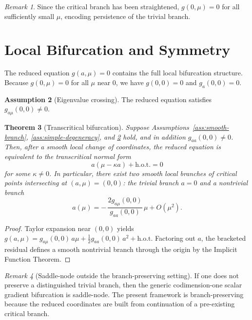 \documentclass[11pt, reqno]{amsart}
\theoremstyle{plain}
\newtheorem{theorem}{Theorem}[section]
\theoremstyle{definition}
\newtheorem{assumption}[theorem]{Assumption}
\theoremstyle{remark}
\newtheorem{remark}[theorem]{Remark}
\begin{document}
\begin{remark}\label{rem:straightened-branch}
Since the critical branch has been straightened, $g(0,\mu)=0$
for all sufficiently small $\mu$, encoding persistence of the trivial branch.
\end{remark}

\section{Local Bifurcation and Symmetry}\label{sec:bifurcation}

The reduced equation
$g(a,\mu)=0$
contains the full local bifurcation structure. Because $g(0,\mu)=0$ for all $\mu$ near $0$, we have
$g(0,0)=0$ and $g_a(0,0)=0$.

\begin{assumption}[Eigenvalue crossing]\label{ass:eigenvalue-crossing}
The reduced equation satisfies
$g_{a\mu}(0,0)\neq 0$.
\end{assumption}

\begin{theorem}[Transcritical bifurcation]\label{thm:transcritical}
Suppose Assumptions~\ref{ass:smooth-branch}, \ref{ass:simple-degeneracy}, and \ref{ass:eigenvalue-crossing} hold, and in addition
$g_{aa}(0,0)\neq 0$.
Then, after a smooth local change of coordinates, the reduced equation is equivalent to the transcritical normal form
\begin{equation}
  a(\mu-\kappa a)+\text{h.o.t.}=0
\end{equation}
for some $\kappa\neq 0$. In particular, there exist two smooth local branches of critical points intersecting at $(a,\mu)=(0,0)$: the trivial branch $a=0$ and a nontrivial branch
\begin{equation}
  a(\mu)= -\,\frac{2g_{a\mu}(0,0)}{g_{aa}(0,0)}\,\mu + O(\mu^2).
\end{equation}
\end{theorem}

\begin{proof}
Taylor expansion near $(0,0)$ yields
$g(a,\mu)=g_{a\mu}(0,0)\,a\mu+\tfrac12 g_{aa}(0,0)\,a^2+\text{h.o.t.}$
Factoring out $a$, the bracketed residual defines a smooth nontrivial branch through the origin by the Implicit Function Theorem.
\end{proof}

\begin{remark}[Saddle-node outside the branch-preserving setting]\label{rem:saddle-node}
If one does not preserve a distinguished trivial branch, then the generic codimension-one scalar gradient bifurcation is saddle-node. The present framework is branch-preserving because the reduced coordinates are built from continuation of a pre-existing critical branch.
\end{remark}
\end{document}
